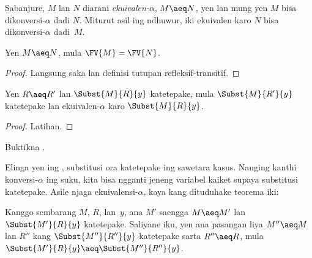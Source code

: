 \documentclass[../../../include/open-logic-section]{subfiles}
\begin{document}
Sabanjure, $M$ lan $N$ diarani
\emph{ekuivalen-$\alpha$}, $M
\aeq N$, yen lan mung yen $M$
bisa dikonversi-$\alpha$ dadi $N$.
Miturut asil ing ndhuwur, iki
ekuivalen karo $N$ bisa
dikonversi-$\alpha$ dadi~$M$.

\begin{thm}
  Yen $M \aeq N$, mula
  $\FV{M} = \FV{N}$.
\end{thm}

\begin{proof}
  Langsung saka 
  lan definisi tutupan refleksif-transitif.
\end{proof}

\begin{lem}
  Yen $R \aeq R'$ lan
  $\Subst{M}{R}{y}$ katetepake,
  mula $\Subst{M}{R'}{y}$
  katetepake lan ekuivalen-$\alpha$
  karo $\Subst{M}{R}{y}$.
\end{lem}

\begin{proof}
  Latihan.
\end{proof}

\begin{prob}
  Buktikna .
\end{prob}

Elinga yen ing ,
substitusi ora katetepake ing sawetara
kasus. Nanging kanthi konversi-$\alpha$
ing suku, kita bisa ngganti jeneng
variabel kaiket supaya substitusi
katetepake. Asile njaga
ekuivalensi-$\alpha$, kaya kang
dituduhake teorema iki:

\begin{thm}
  Kanggo sembarang $M$, $R$, lan~$y$,
  ana $M'$ saengga $M \aeq M'$
  lan $\Subst{M'}{R}{y}$ katetepake.
  Saliyane iku, yen ana pasangan liya
  $M'' \aeq M$ lan $R''$ kang
  $\Subst{M''}{R''}{y}$ katetepake
  sarta $R'' \aeq R$, mula
  $\Subst{M'}{R}{y} \aeq
  \Subst{M''}{R''}{y}$.
\end{thm}
\end{document}
